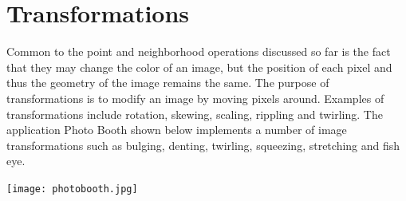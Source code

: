 \documentclass{book}
\begin{document}
\addtocounter{chapter}{5}

\chapter{Transformations}
Common to the point and neighborhood operations discussed so far is the fact that they may change the color of an image, but the position of each pixel and thus the geometry of the image remains the same. The purpose of transformations is to modify an image by moving pixels around. Examples of transformations include rotation, skewing, scaling, rippling and twirling. The application Photo Booth shown below implements a number of image transformations such as bulging, denting, twirling, squeezing, stretching and fish eye.

\begin{center}
\texttt{[image: photobooth.jpg]}\label{img:photobooth}
\end{center}
\end{document}
